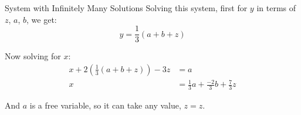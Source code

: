 \begin{example}{System with Infinitely Many Solutions}
  Solving this system, first for $y$ in terms of $z$, $a$, $b$, we get:
  \begin{equation*}
    y = \frac{1}{3} (a + b + z)
  \end{equation*}

  Now solving for $x$:
  \begin{align*}
    x + 2 \left( \frac{1}{3} (a + b + z) \right) - 3z &= a \\
    x &= \frac{1}{3} a + \frac{-2}{3} b + \frac{7}{3} z
  \end{align*}

  And $a$ is a free variable, so it can take any value, $z=z$.
\end{example}

